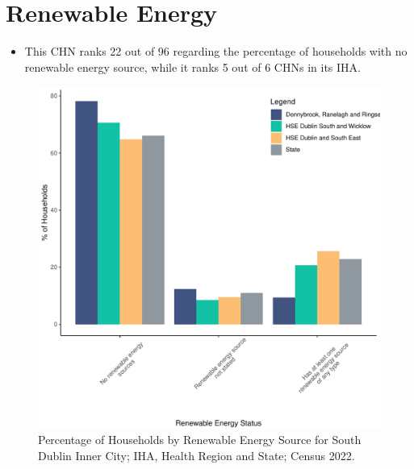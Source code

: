 \documentclass{article}
\begin{document}
\section{Renewable Energy}\label{sect:RE}
\begin{itemize}
\item This CHN ranks  22 out of 96 regarding the percentage of households with no renewable energy source, while it ranks   5 out of 6 CHNs in its IHA.
\end{itemize}
\begin{figure}[H]
	\centering
	\includegraphics[width = 140mm]{../figures/RenewableEnergyED.pdf}
	\caption{Percentage of Households by Renewable Energy Source for South Dublin Inner City; IHA, Health Region and State; Census 2022.}
	\label{fig:vbnv}
	\end{figure}
\end{document}
